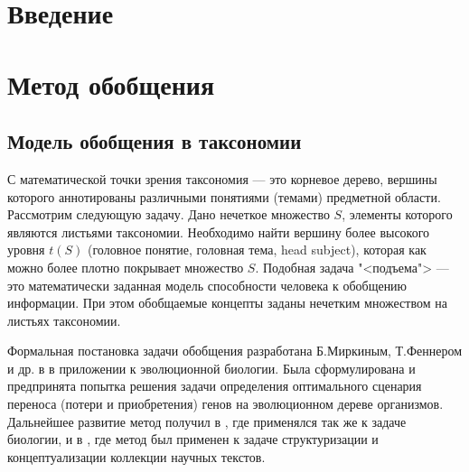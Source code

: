 \documentclass[12pt]{article}
\begin{document}


\thispagestyle{empty}
\begin{abstract}
	...
\end{abstract}

\renewcommand{\abstractname}{Abstract}
\begin{abstract}
	...
\end{abstract}
\newpage



\setcounter{page}{1}
\tableofcontents
\newpage

\section{Введение}

\section{Метод обобщения}

\subsection{Модель обобщения в таксономии}

С математической точки зрения таксономия --- это корневое дерево, вершины которого аннотированы различными понятиями (темами) предметной области. Рассмотрим следующую задачу. Дано нечеткое множество $S$, элементы которого являются листьями таксономии. Необходимо найти вершину более высокого уровня $t(S)$ (головное понятие, головная тема, head subject), которая как можно более плотно покрывает множество $S$. Подобная задача "<подъема"> --- это математически заданная модель способности человека к обобщению информации. При этом обобщаемые концепты заданы нечетким множеством на листьях таксономии.

Формальная постановка задачи обобщения разработана Б.Миркиным, Т.Феннером и др. в \cite{mirkin2003algorithms} в приложении к эволюционной биологии. Была сформулирована и предпринята попытка решения задачи определения оптимального сценария переноса (потери и приобретения) генов на эволюционном дереве организмов. Дальнейшее развитие метод получил в \cite{mirkin2006aggregating}, где применялся так же к задаче биологии, и в \cite{mirkin2018preprint}, где метод был применен к задаче структуризации и концептуализации коллекции научных текстов.
\end{document}
